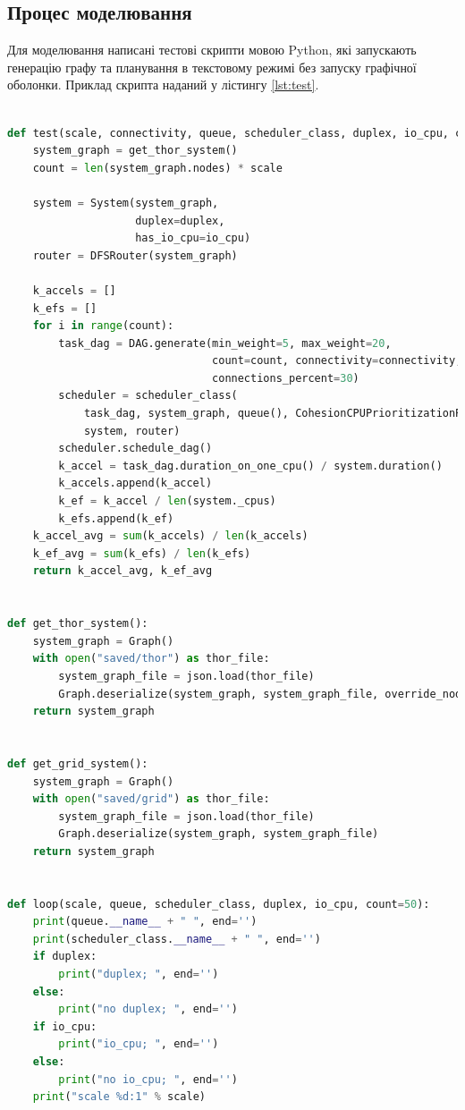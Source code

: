 \subsection{Процес моделювання}

Для моделювання написані тестові скрипти мовою Python, які запускають генерацію графу та планування в текстовому режимі без запуску графічної оболонки. Приклад скрипта наданий у лістингу \ref{lst:test}.

\begin{lstlisting}[language=Python,caption={Вихідний код скрипта порівняння 3 та 4 черги для алгоритму 6 з 3 лінками},label=lst:test]

def test(scale, connectivity, queue, scheduler_class, duplex, io_cpu, count=50):
    system_graph = get_thor_system()
    count = len(system_graph.nodes) * scale

    system = System(system_graph,
                    duplex=duplex,
                    has_io_cpu=io_cpu)
    router = DFSRouter(system_graph)

    k_accels = []
    k_efs = []
    for i in range(count):
        task_dag = DAG.generate(min_weight=5, max_weight=20,
                                count=count, connectivity=connectivity,
                                connections_percent=30)
        scheduler = scheduler_class(
            task_dag, system_graph, queue(), CohesionCPUPrioritizationPolicy(),
            system, router)
        scheduler.schedule_dag()
        k_accel = task_dag.duration_on_one_cpu() / system.duration()
        k_accels.append(k_accel)
        k_ef = k_accel / len(system._cpus)
        k_efs.append(k_ef)
    k_accel_avg = sum(k_accels) / len(k_accels)
    k_ef_avg = sum(k_efs) / len(k_efs)
    return k_accel_avg, k_ef_avg


def get_thor_system():
    system_graph = Graph()
    with open("saved/thor") as thor_file:
        system_graph_file = json.load(thor_file)
        Graph.deserialize(system_graph, system_graph_file, override_node={"weight": 3})
    return system_graph


def get_grid_system():
    system_graph = Graph()
    with open("saved/grid") as thor_file:
        system_graph_file = json.load(thor_file)
        Graph.deserialize(system_graph, system_graph_file)
    return system_graph


def loop(scale, queue, scheduler_class, duplex, io_cpu, count=50):
    print(queue.__name__ + " ", end='')
    print(scheduler_class.__name__ + " ", end='')
    if duplex:
        print("duplex; ", end='')
    else:
        print("no duplex; ", end='')
    if io_cpu:
        print("io_cpu; ", end='')
    else:
        print("no io_cpu; ", end='')
    print("scale %d:1" % scale)


\end{lstlisting}
